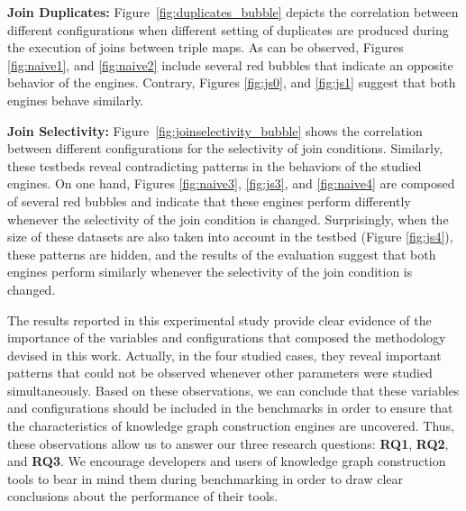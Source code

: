 \noindent \textbf{Join Duplicates:}
Figure~\ref{fig:duplicates_bubble} depicts the correlation between different configurations when different setting of duplicates are produced during the execution of joins between triple maps. As can be observed, Figures \ref{fig:naive1}, and \ref{fig:naive2} include several red bubbles that indicate an opposite behavior of the engines. Contrary, Figures \ref{fig:js0}, and \ref{fig:js1} suggest that both engines behave similarly. 


\noindent \textbf{Join Selectivity:}
Figure~\ref{fig:joinselectivity_bubble} shows the correlation between different configurations for the selectivity of join conditions. Similarly, these testbeds reveal contradicting patterns in the behaviors of the studied engines. On one hand, Figures \ref{fig:naive3}, \ref{fig:js3}, and \ref{fig:naive4} are composed of several red bubbles and indicate that these engines perform differently whenever the selectivity of the join condition is changed. Surprisingly,  when the size of these datasets are also taken into account in the testbed (Figure \ref{fig:js4}), these patterns are hidden, and the results of the evaluation suggest that both engines perform similarly whenever the selectivity of the join condition is changed. 

The results reported in this experimental study provide clear evidence of the importance of the variables and configurations that composed the methodology devised in this work. Actually, in the four studied cases, they reveal important patterns that could not be observed whenever other parameters were studied simultaneously. Based on these observations, we can conclude that these variables and configurations should be included in the benchmarks in order to ensure that the characteristics of knowledge graph construction engines are uncovered. Thus, these observations allow us to answer our three research questions: \textbf{RQ1}, \textbf{RQ2}, and \textbf{RQ3}. We encourage developers and users of knowledge graph construction tools to bear in mind them during benchmarking in order to draw clear conclusions about the performance of their tools.


